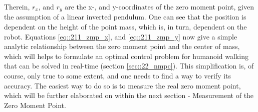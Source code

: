 Therein, $r_x$, and $r_y$ are the x-, and y-coordinates of the zero moment point, given the assumption of a linear inverted pendulum. One can see that the position is dependent on the height of the point mass, which is, in turn, dependent on the robot. Equations \ref{eq::211_zmp_x}, and \ref{eq::211_zmp_y} now give a simple analytic relationship between the zero moment point and the center of mass, which will helps to formulate an optimal control problem for humanoid walking that can be solved in real-time (section \ref{sec::22_nmpc}). This simplification is, of course, only true to some extent, and one needs to find a way to verify its accuracy. The easiest way to do so is to measure the real zero moment point, which will be further elaborated on within the next section - Measurement of the Zero Moment Point.

\FloatBarrier
